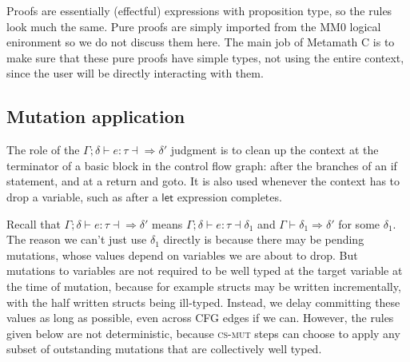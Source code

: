 \documentclass[acmsmall,nonacm]{acmart}
\DeclareMathOperator*{\Sep}{\scalerel*{\ast}{\sum}}
\newcommand{\wand}{\mathrel{-\!\!\ast}}
\newcommand{\proves}{\vdash}
\newcommand{\makes}{\dashv}
\newcommand{\constep}{\Rightarrow}
\newcommand{\makesto}{\dashv\!\constep}
\begin{document}

Proofs are essentially (effectful) expressions with proposition type, so the rules look much the same. Pure proofs are simply imported from the MM0 logical enironment so we do not discuss them here. The main job of Metamath C is to make sure that these pure proofs have simple types, not using the entire context, since the user will be directly interacting with them.

\subsection{Mutation application}\label{sec:mutapp}

The role of the $\Gamma;\delta\proves e:\tau\makesto\delta'$ judgment is to clean up the context at the terminator of a basic block in the control flow graph: after the branches of an \textsf{if} statement, and at a \textsf{return} and \textsf{goto}. It is also used whenever the context has to drop a variable, such as after a $\mathsf{let}$ expression completes.

Recall that $\Gamma;\delta\proves e:\tau\makesto\delta'$ means $\Gamma;\delta\proves e:\tau\makes\delta_1$ and $\Gamma\proves\delta_1\constep\delta'$ for some $\delta_1$. The reason we can't just use $\delta_1$ directly is because there may be pending mutations, whose values depend on variables we are about to drop. But mutations to variables are not required to be well typed at the target variable at the time of mutation, because for example structs may be written incrementally, with the half written structs being ill-typed. Instead, we delay committing these values as long as possible, even across CFG edges if we can. However, the rules given below are not deterministic, because \textsc{cs-mut} steps can choose to apply any subset of outstanding mutations that are collectively well typed.
\end{document}
